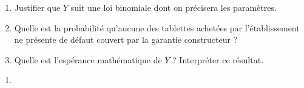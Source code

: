 \par
\begin{enumerate}
     \par
     \item %
     Justifier que $Y$ suit une loi binomiale dont on précisera les paramètres.
     \par
     \item %
     Quelle est la probabilité qu'aucune des tablettes achetées par l'établissement ne présente de défaut couvert par la garantie constructeur ?
     \par
     \item %
     Quelle est l'espérance mathématique de $Y$ ? Interpréter ce résultat.
     \par
\end{enumerate}
\begin{corrige}
     \par
     \begin{enumerate}
          \par
          \item %


\end{enumerate}
\end{corrige}

